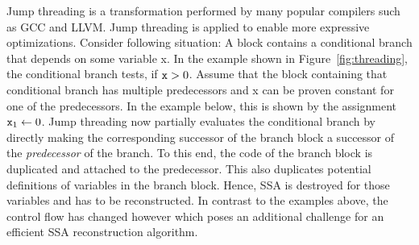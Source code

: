 Jump threading is a transformation performed by many popular compilers such as GCC and LLVM.
Jump threading is applied to enable more expressive optimizations. 
Consider following situation:
A block contains a conditional branch that depends on some variable \var x.
In the example shown in Figure~\ref{fig:threading}, the conditional branch tests, if $\mathtt{x}> 0$.
Assume that the block containing that conditional branch has multiple predecessors and \var x can be proven constant for one of the predecessors.
In the example below, this is shown by the assignment $\mathtt{x}_1\gets 0$. 
Jump threading now partially evaluates the conditional branch by directly making the corresponding successor of the branch block a successor of the \emph{predecessor} of the branch.
To this end, the code of the branch block is duplicated and attached to the predecessor. 
This also duplicates potential definitions of variables in the branch block.
Hence, SSA is destroyed for those variables and has to be reconstructed. 
In contrast to the examples above, the control flow has changed however which poses an additional challenge for an efficient SSA reconstruction algorithm. 
